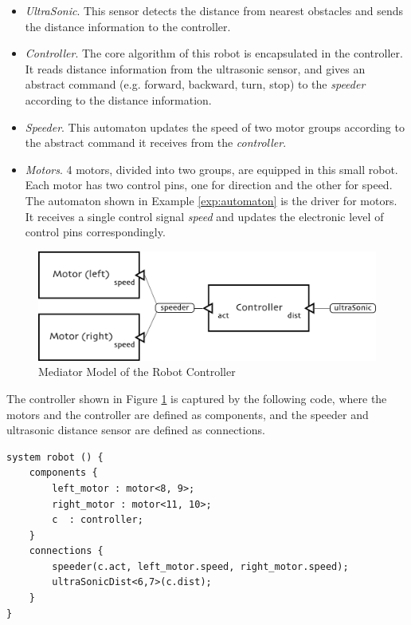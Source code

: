 \begin{itemize}
    \item \emph{UltraSonic}. This sensor detects the distance from nearest obstacles and sends the distance information to the controller.
    \item \emph{Controller}. The core algorithm of this robot is encapsulated in the controller. It reads distance information from the ultrasonic sensor, and gives an abstract command (e.g. forward, backward, turn, stop) to the \emph{speeder} according to the distance information.
    \item \emph{Speeder}. This automaton updates the speed of two motor groups according to the abstract command it receives from the \emph{controller}.
    \item \emph{Motors}. 4 motors, divided into two groups, are equipped in this small robot. Each motor has two control pins, one for direction and the other for speed. The \lang{} automaton shown in Example \ref{exp:automaton} is the driver for motors. It receives a single control signal \emph{speed} and updates the electronic level of control pins correspondingly.
\end{itemize}

\begin{figure}[ht]
    \centering
    \includegraphics[width=.8\textwidth]{images/architecture.png}
    \caption{Mediator Model of the Robot Controller}
    \label{img:controller}
\end{figure}

The controller shown in Figure \ref{img:controller} is captured by the following \lang{} code, where the motors and the controller are defined as components, and the speeder and ultrasonic distance sensor are defined as connections.
    \label{exp:system}
\begin{lstlisting}
system robot () {
    components {
        left_motor : motor<8, 9>;
        right_motor : motor<11, 10>;
        c  : controller;
    }
    connections {
        speeder(c.act, left_motor.speed, right_motor.speed);
        ultraSonicDist<6,7>(c.dist);
    }
}
\end{lstlisting}

